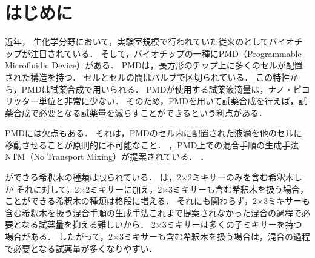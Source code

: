 \chapter{はじめに}
近年， 生化学分野において，実験室規模で行われていた従来のとしてバイオチップが注目されている．
そして，バイオチップの一種にPMD（Programmable Microfluidic Device）がある\cite{PMDDescription}．
PMDは，長方形のチップ上に多くのセルが配置された構造を持つ．
セルとセルの間はバルブで区切られている．
この特性から，PMDは試薬合成で用いられる\cite{C0LC00537A}．
PMDが使用する試薬液滴量は，ナノ・ピコリッター単位と非常に少ない．
そのため，PMDを用いて試薬合成を行えば，試薬合成で必要となる試薬量を減らすことができるという利点がある\cite{PMDDescription}．

PMDには欠点もある．
それは，PMDのセル内に配置された液滴を他のセルに移動させることが原則的に不可能なこと\cite{9116370}．
，PMD上での混合手順の生成手法NTM（No Transport Mixing）が提案されている\cite{9116370}．
．

ができる希釈木の種類は限られている．
は，2$\times$2ミキサーのみを含む希釈木しか
それに対して，2$\times$2ミキサーに加え，2$\times$3ミキサーも含む希釈木を扱う場合，ことができる希釈木の種類は格段に増える．
それにも関わらず，2$\times$3ミキサーも含む希釈木を扱う混合手順の生成手法これまで提案されなかった混合の過程で必要となる試薬量を抑える難しいから．
2$\times$3ミキサーは多くの子ミキサーを持つ場合がある．
したがって，2$\times$3ミキサーも含む希釈木を扱う場合は，混合の過程で必要となる試薬量が多くなりやすい． 

